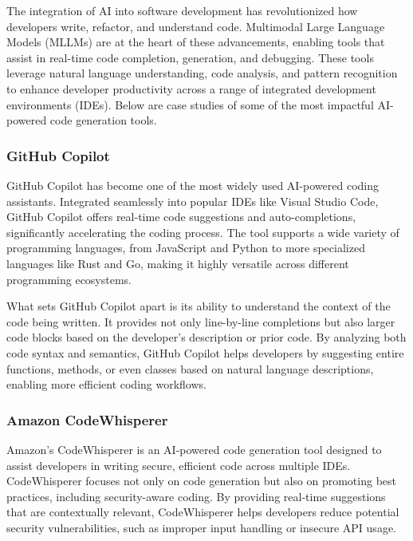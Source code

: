 The integration of AI into software development has revolutionized how developers write, refactor, and understand code. Multimodal Large Language Models (MLLMs) are at the heart of these advancements, enabling tools that assist in real-time code completion, generation, and debugging. These tools leverage natural language understanding, code analysis, and pattern recognition to enhance developer productivity across a range of integrated development environments (IDEs). Below are case studies of some of the most impactful AI-powered code generation tools.

\subsubsection{GitHub Copilot}

GitHub Copilot \cite{GitHubCopilot} has become one of the most widely used AI-powered coding assistants. Integrated seamlessly into popular IDEs like Visual Studio Code, GitHub Copilot offers real-time code suggestions and auto-completions, significantly accelerating the coding process. The tool supports a wide variety of programming languages, from JavaScript and Python to more specialized languages like Rust and Go, making it highly versatile across different programming ecosystems.

What sets GitHub Copilot apart is its ability to understand the context of the code being written. It provides not only line-by-line completions but also larger code blocks based on the developer's description or prior code. By analyzing both code syntax and semantics, GitHub Copilot helps developers by suggesting entire functions, methods, or even classes based on natural language descriptions, enabling more efficient coding workflows.

\subsubsection{Amazon CodeWhisperer}

Amazon's CodeWhisperer \cite{AmazonCodeWhisperer} is an AI-powered code generation tool designed to assist developers in writing secure, efficient code across multiple IDEs. CodeWhisperer focuses not only on code generation but also on promoting best practices, including security-aware coding. By providing real-time suggestions that are contextually relevant, CodeWhisperer helps developers reduce potential security vulnerabilities, such as improper input handling or insecure API usage.

